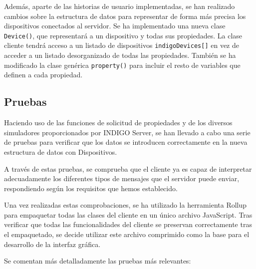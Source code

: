Además, aparte de las historias de usuario implementadas, se han realizado cambios sobre la estructura de datos para representar de forma más precisa los dispositivos conectados al servidor. Se ha implementado una nueva clase \texttt{Device()}, que representará a un dispositivo y todas sus propiedades. La clase cliente tendrá acceso a un listado de dispositivos \texttt{indigoDevices[]} en vez de acceder a un listado desorganizado de todas las propiedades. También se ha modificado la clase genérica \texttt{property()} para incluir el resto de variables que definen a cada propiedad.


\subsection{Pruebas}

Haciendo uso de las funciones de solicitud de propiedades y de los diversos simuladores proporcionados por INDIGO Server, se han llevado a cabo una serie de pruebas para verificar que los datos se introducen correctamente en la nueva estructura de datos con Dispositivos.

A través de estas pruebas, se comprueba que el cliente ya es capaz de interpretar adecuadamente los diferentes tipos de mensajes que el servidor puede enviar, respondiendo según los requisitos que hemos establecido.

Una vez realizadas estas comprobaciones, se ha utilizado la herramienta Rollup para empaquetar todas las clases del cliente en un único archivo JavaScript. Tras verificar que todas las funcionalidades del cliente se preservan correctamente tras el empaquetado, se decide utilizar este archivo comprimido como la base para el desarrollo de la interfaz gráfica. 

Se comentan más detalladamente las pruebas más relevantes:

